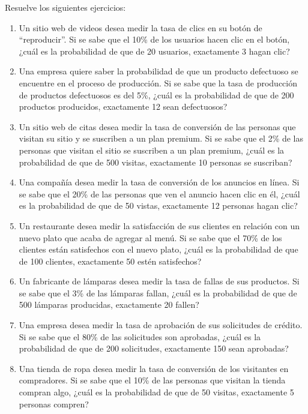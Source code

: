 \begin{Ejer}
Resuelve los siguientes ejercicios:
\begin{enumerate}

    \item Un sitio web de videos desea medir la tasa de clics en su botón de ``reproducir''. Si se sabe que el 10\% de los usuarios hacen clic en el botón, ¿cuál es la probabilidad de que de 20 usuarios, exactamente 3 hagan clic?

    \item Una empresa quiere saber la probabilidad de que un producto defectuoso se encuentre en el proceso de producción. Si se sabe que la tasa de producción de productos defectuosos es del 5\%, ¿cuál es la probabilidad de que de 200 productos producidos, exactamente 12 sean defectuosos?

    \item Un sitio web de citas desea medir la tasa de conversión de las personas que visitan su sitio y se suscriben a un plan premium. Si se sabe que el 2\% de las personas que visitan el sitio se suscriben a un plan premium, ¿cuál es la probabilidad de que de 500 visitas, exactamente 10 personas se suscriban?

    \item Una compañía desea medir la tasa de conversión de los anuncios en línea. Si se sabe que el 20\% de las personas que ven el anuncio hacen clic en él, ¿cuál es la probabilidad de que de 50 vistas, exactamente 12 personas hagan clic?

    \item Un restaurante desea medir la satisfacción de sus clientes en relación con un nuevo plato que acaba de agregar al menú. Si se sabe que el 70\% de los clientes están satisfechos con el nuevo plato, ¿cuál es la probabilidad de que de 100 clientes, exactamente 50 estén satisfechos?

    \item Un fabricante de lámparas desea medir la tasa de fallas de sus productos. Si se sabe que el 3\% de las lámparas fallan, ¿cuál es la probabilidad de que de 500 lámparas producidas, exactamente 20 fallen?

    \item Una empresa desea medir la tasa de aprobación de sus solicitudes de crédito. Si se sabe que el 80\% de las solicitudes son aprobadas, ¿cuál es la probabilidad de que de 200 solicitudes, exactamente 150 sean aprobadas?

    \item Una tienda de ropa desea medir la tasa de conversión de los visitantes en compradores. Si se sabe que el 10\% de las personas que visitan la tienda compran algo, ¿cuál es la probabilidad de que de 50 visitas, exactamente 5 personas compren?


\end{enumerate}
\end{Ejer}
